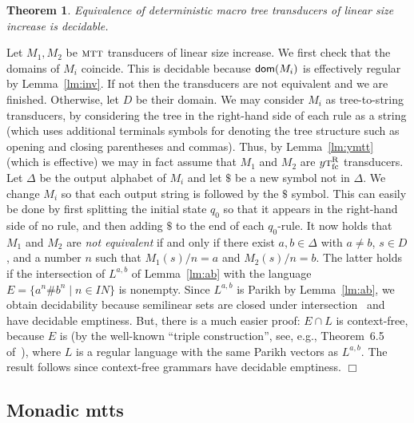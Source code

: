 \documentclass[copyright,creativecommons]{eptcs}
\newtheorem{theorem}{Theorem}
\newcommand{\eop}{\hspace*{\fill}$\Box$}
\newenvironment{proof}{{\it Proof.}\quad}{\eop\vspace*{4mm}}
\newcommand{\dom}[1]{{\sf dom}(#1)}
\newcommand{\trfc}{\textsc{t}^{\text{R}}_{\text{fc}}}
\newcommand{\mtt}{\textsc{mtt}}
\newcommand{\nat}{I\!\!N}
\begin{document}
\begin{theorem}\label{theo:mttlsi}
Equivalence of deterministic macro tree transducers of linear size increase
is decidable.
\end{theorem}
\begin{proof}
Let $M_1, M_2$ be $\mtt$ transducers of linear size increase.
We first check that the domains of $M_i$ coincide. This is decidable
because $\dom{M_i}$ is effectively regular by Lemma~\ref{lm:inv}.
If not then the transducers are not equivalent and we are finished.
Otherwise, let $D$ be their domain. 
We may consider $M_i$ as tree-to-string transducers, by considering
the tree in the right-hand side of each rule as a string (which
uses additional terminals symbols for denoting the tree structure
such as opening and closing parentheses and commas). 
Thus, by Lemma~\ref{lm:ymtt} (which is effective) we may in fact assume 
that $M_1$ and $M_2$ are $y\trfc$ transducers.
Let $\Delta$ be
the output alphabet of $M_i$ and let $\$$ be a new symbol not in $\Delta$. 
We change $M_i$ so that each output string is followed by the $\$$ symbol.
This can easily be done by first splitting the initial state $q_0$ so that it appears
in the right-hand side of no rule, and then adding $\$$ to the end
of each $q_0$-rule. It now holds that $M_1$ and $M_2$ are \emph{not equivalent} if and only
if there exist $a,b\in\Delta$ with $a\not=b$, $s\in D$, and a number $n$ such that
$M_1(s)/n=a$ and $M_2(s)/n=b$. The latter holds if the intersection of $L^{a,b}$ of Lemma~\ref{lm:ab}
with the language $E=\{a^n\# b^n\mid n\in\nat\}$ is nonempty.
Since $L^{a,b}$ is Parikh by Lemma~\ref{lm:ab}, we obtain decidability because
semilinear sets are closed under intersection~\cite{ginspa64,gin66} and have decidable emptiness.
But, there is a much easier proof: $E\cap L$ is context-free, because $E$ is
(by the well-known ``triple construction'', see, e.g.,
Theorem~6.5 of~\cite{DBLP:books/aw/HopcroftU79}),
where $L$ is a regular language with the same Parikh vectors as $L^{a,b}$.
The result follows since context-free grammars have decidable emptiness.
\end{proof}

\subsection{Monadic mtts}
\end{document}
